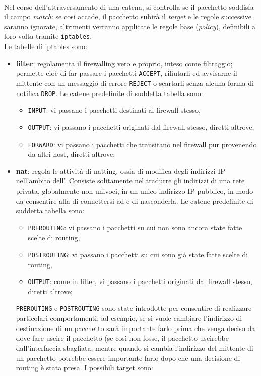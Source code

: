 \documentclass[a4paper,11pt]{article}
\def\code#1{\texttt{#1}}
\def\vedi#1{\nameref{#1}}
\begin{document}
\\Nel corso dell'attraversamento di una catena, si controlla se il pacchetto soddisfa il campo \textit{match}: se così accade, il pacchetto subirà il \textit{target} e le regole successive saranno ignorate, altrimenti verranno applicate le regole base (\textit{policy}), definibili a loro volta tramite \code{iptables}.\\
Le tabelle di iptables sono:
\begin{itemize}
\item \textbf{filter}: regolamenta il firewalling vero e proprio, inteso come filtraggio; permette cioè di far passare i pacchetti \code{ACCEPT}, rifiutarli ed avvisarne il mittente con un messaggio di errore \code{REJECT} o scartarli senza alcuna forma di notifica \code{DROP}.
Le catene predefinite di suddetta tabella sono:
\begin{itemize}
\item \code{INPUT}: vi passano i pacchetti destinati al firewall stesso,
\item \code{OUTPUT}: vi passano i pacchetti originati dal firewall stesso, diretti altrove,
\item \code{FORWARD}: vi passano i pacchetti che transitano nel firewall pur provenendo da altri host, diretti altrove;
\end{itemize}
\item \textbf{nat}: regola le attività di natting, ossia di modifica degli indirizzi IP nell'ambito dell'\vedi{Oscuramento}. Consiste solitamente nel tradurre gli indirizzi di una rete privata, globalmente non univoci, in un unico indirizzo IP pubblico, in modo da consentire alla \vedi{LAN} di connettersi ad \vedi{Internet} e di nasconderla. Le catene predefinite di suddetta tabella sono: \label{NAT}
\begin{itemize}
\item \code{PREROUTING}: vi passano i pacchetti su cui non sono ancora state fatte scelte di routing,
\item \code{POSTROUTING}: vi passano i pacchetti su cui sono già state fatte scelte di routing,
\item \code{OUTPUT}: come in filter, vi passano i pacchetti originati dal firewall stesso, diretti altrove;
\end{itemize}
\code{PREROUTING} e \code{POSTROUTING} sono state introdotte per consentire di realizzare particolari comportamenti: ad esempio, se si vuole cambiare l’indirizzo di destinazione di un pacchetto sarà importante farlo prima che venga deciso da dove fare uscire il pacchetto (se così non fosse, il pacchetto uscirebbe dall’interfaccia sbagliata, mentre quando si cambia l'indirizzo del mittente di un pacchetto potrebbe essere importante farlo dopo che una decisione di routing è stata presa. I possibili target sono:

\end{itemize}
\end{document}
